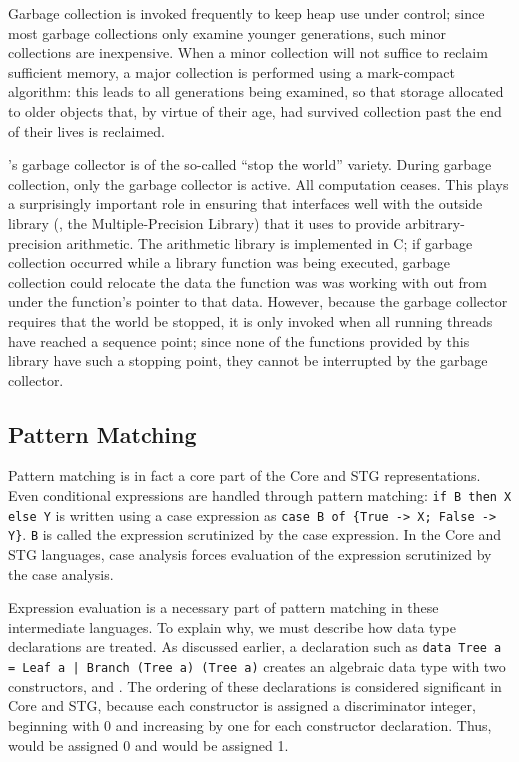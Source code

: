 Garbage collection is invoked frequently to keep heap use under control; since most garbage collections only examine younger generations, such minor collections are inexpensive. When a minor collection will not suffice to reclaim sufficient memory, a major collection is performed using a mark-compact algorithm: this leads to all generations being examined, so that storage allocated to older objects that, by virtue of their age, had survived collection past the end of their lives is reclaimed.

\GHC{}'s garbage collector is of the so-called ``stop the world'' variety. During garbage collection, only the garbage collector is active. All computation ceases. This plays a surprisingly important role in ensuring that \GHC interfaces well with the outside library (, the  Multiple-Precision Library) that it uses to provide arbitrary-precision arithmetic. The arithmetic library is implemented in C; if garbage collection occurred while a library function was being executed, garbage collection could relocate the data the function was was working with out from under the function's pointer to that data. However, because the garbage collector requires that the world be stopped, it is only invoked when all running threads have reached a sequence point; since none of the functions provided by this library have such a stopping point, they cannot be interrupted by the garbage collector.

\subsection{Pattern Matching}
Pattern matching is in fact a core part of the Core and STG representations. Even conditional expressions are handled through pattern matching: \lstinline{if B then X else Y} is written using a case expression as \lstinline|case B of {True -> X; False -> Y}|. \lstinline{B} is called the expression scrutinized by the case expression. In the Core and STG languages, case analysis forces evaluation of the expression scrutinized by the case analysis.

Expression evaluation is a necessary part of pattern matching in these intermediate languages. To explain why, we must describe how data type declarations are treated. As discussed earlier, a declaration such as \lstinline{data Tree a = Leaf a | Branch (Tree a) (Tree a)} creates an algebraic data type with two constructors,  and . The ordering of these declarations is considered significant in Core and STG, because each constructor is assigned a discriminator integer, beginning with 0 and increasing by one for each constructor declaration. Thus,  would be assigned 0 and  would be assigned 1.

